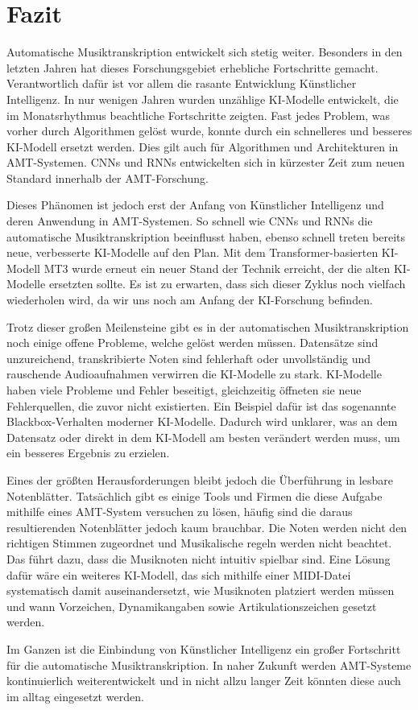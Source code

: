 \section{Fazit}
Automatische Musiktranskription entwickelt sich stetig weiter.
Besonders in den letzten Jahren hat dieses Forschungsgebiet erhebliche Fortschritte gemacht.
Verantwortlich dafür ist vor allem die rasante Entwicklung Künstlicher Intelligenz.
In nur wenigen Jahren wurden unzählige KI-Modelle entwickelt, die im Monatsrhythmus beachtliche Fortschritte zeigten.
Fast jedes Problem, was vorher durch Algorithmen gelöst wurde,
konnte durch ein schnelleres und besseres KI-Modell ersetzt werden.
Dies gilt auch für Algorithmen und Architekturen in AMT-Systemen.
CNNs und RNNs entwickelten sich in kürzester Zeit zum neuen Standard innerhalb der AMT-Forschung.

Dieses Phänomen ist jedoch erst der Anfang von Künstlicher Intelligenz und deren Anwendung in AMT-Systemen.
So schnell wie CNNs und RNNs die automatische Musiktranskription beeinflusst haben,
ebenso schnell treten bereits neue, verbesserte KI-Modelle auf den Plan.
Mit dem Transformer-basierten KI-Modell MT3 wurde erneut ein neuer Stand der Technik erreicht,
der die alten KI-Modelle ersetzten sollte.
Es ist zu erwarten, dass sich dieser Zyklus noch vielfach wiederholen wird,
da wir uns noch am Anfang der KI-Forschung befinden.

Trotz dieser großen Meilensteine gibt es in der automatischen Musiktranskription noch einige offene Probleme,
welche gelöst werden müssen.
Datensätze sind unzureichend, transkribierte Noten sind fehlerhaft oder unvollständig
und rauschende Audioaufnahmen verwirren die KI-Modelle zu stark.
KI-Modelle haben viele Probleme und Fehler beseitigt,
gleichzeitig öffneten sie neue Fehlerquellen, die zuvor nicht existierten.
Ein Beispiel dafür ist das sogenannte Blackbox-Verhalten moderner KI-Modelle.
Dadurch wird unklarer, was an dem Datensatz oder direkt in dem KI-Modell am besten verändert werden muss,
um ein besseres Ergebnis zu erzielen.

Eines der größten Herausforderungen bleibt jedoch die Überführung in lesbare Notenblätter.
Tatsächlich gibt es einige Tools und Firmen die diese Aufgabe mithilfe eines AMT-System versuchen zu lösen,
häufig sind die daraus resultierenden Notenblätter jedoch kaum brauchbar.
Die Noten werden nicht den richtigen Stimmen zugeordnet und Musikalische regeln werden nicht beachtet.
Das führt dazu, dass die Musiknoten nicht intuitiv spielbar sind.
Eine Lösung dafür wäre ein weiteres KI-Modell,
das sich mithilfe einer MIDI-Datei systematisch damit auseinandersetzt,
wie Musiknoten platziert werden müssen und wann Vorzeichen, Dynamikangaben sowie Artikulationszeichen gesetzt werden.

Im Ganzen ist die Einbindung von Künstlicher Intelligenz ein großer Fortschritt für die automatische Musiktranskription.
In naher Zukunft werden AMT-Systeme kontinuierlich weiterentwickelt
und in nicht allzu langer Zeit könnten diese auch im alltag eingesetzt werden.

